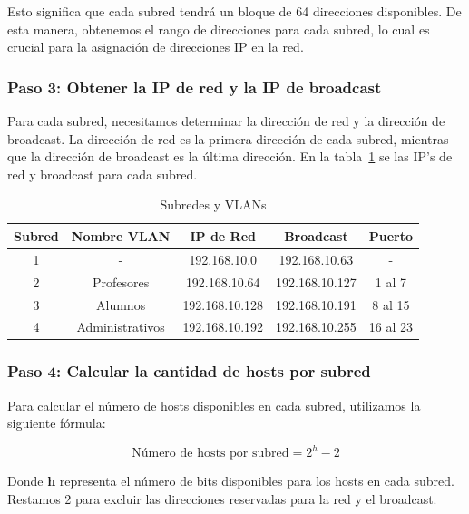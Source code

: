     Esto significa que cada subred tendrá un bloque de 64 direcciones disponibles. De esta manera, obtenemos el rango de direcciones para cada subred, lo cual es crucial para la asignación de direcciones IP en la red.

    \subsubsection*{Paso 3: Obtener la IP de red y la IP de broadcast}

    Para cada subred, necesitamos determinar la dirección de red y la dirección de broadcast. La dirección de red es la primera dirección de cada subred, mientras que la dirección de broadcast es la última dirección. En la tabla~\ref{tab:VLANs} se las IP's de red y broadcast para cada subred.

    \begin{table}[H]
        \begin{center}
            \begin{tabular}{ c | c | c | c | c }
                \textbf{Subred} & \textbf{Nombre VLAN} & \textbf{IP de Red} & \textbf{Broadcast} & \textbf{Puerto}\\ \hline
                1 & - & 192.168.10.0 & 192.168.10.63 & - \\
                2 & Profesores & 192.168.10.64 & 192.168.10.127 & 1 al 7\\
                3 & Alumnos & 192.168.10.128 & 192.168.10.191 & 8 al 15\\
                4 & Administrativos & 192.168.10.192 & 192.168.10.255 & 16 al 23\\
            \end{tabular}
            \caption{Subredes y VLANs}
            \label{tab:VLANs}
        \end{center}
    \end{table}

    \subsubsection*{Paso 4: Calcular la cantidad de hosts por subred}
    Para calcular el número de hosts disponibles en cada subred, utilizamos la siguiente fórmula:

    \begin{equation}
        \text{Número de hosts por subred} = 2^h - 2
        \label{eq:hosts}
    \end{equation}

    Donde \textbf{h} representa el número de bits disponibles para los hosts en cada subred. Restamos 2 para excluir las direcciones reservadas para la red y el broadcast.
    
